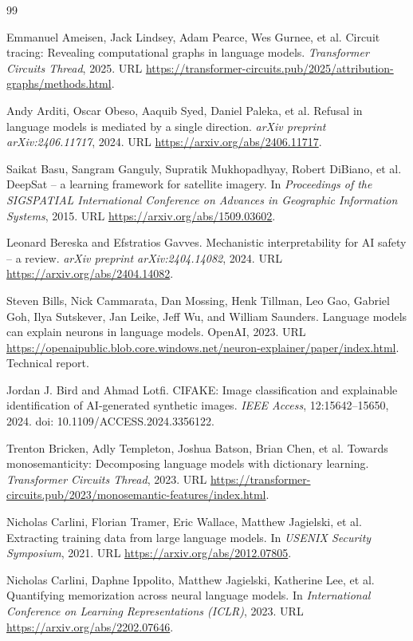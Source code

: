 \documentclass[11pt]{article}
\begin{document}
\begin{thebibliography}{99}

 Emmanuel Ameisen, Jack Lindsey, Adam Pearce, Wes Gurnee, et al. Circuit tracing: Revealing computational graphs in language models. \emph{Transformer Circuits Thread}, 2025. URL \url{https://transformer-circuits.pub/2025/attribution-graphs/methods.html}.

 Andy Arditi, Oscar Obeso, Aaquib Syed, Daniel Paleka, et al. Refusal in language models is mediated by a single direction. \emph{arXiv preprint arXiv:2406.11717}, 2024. URL \url{https://arxiv.org/abs/2406.11717}.

 Saikat Basu, Sangram Ganguly, Supratik Mukhopadhyay, Robert DiBiano, et al. DeepSat -- a learning framework for satellite imagery. In \emph{Proceedings of the SIGSPATIAL International Conference on Advances in Geographic Information Systems}, 2015. URL \url{https://arxiv.org/abs/1509.03602}.

 Leonard Bereska and Efstratios Gavves. Mechanistic interpretability for AI safety -- a review. \emph{arXiv preprint arXiv:2404.14082}, 2024. URL \url{https://arxiv.org/abs/2404.14082}.

 Steven Bills, Nick Cammarata, Dan Mossing, Henk Tillman, Leo Gao, Gabriel Goh, Ilya Sutskever, Jan Leike, Jeff Wu, and William Saunders. Language models can explain neurons in language models. OpenAI, 2023. URL \url{https://openaipublic.blob.core.windows.net/neuron-explainer/paper/index.html}. Technical report.

 Jordan J. Bird and Ahmad Lotfi. CIFAKE: Image classification and explainable identification of AI-generated synthetic images. \emph{IEEE Access}, 12:15642--15650, 2024. doi: 10.1109/ACCESS.2024.3356122.

 Trenton Bricken, Adly Templeton, Joshua Batson, Brian Chen, et al. Towards monosemanticity: Decomposing language models with dictionary learning. \emph{Transformer Circuits Thread}, 2023. URL \url{https://transformer-circuits.pub/2023/monosemantic-features/index.html}.

 Nicholas Carlini, Florian Tramer, Eric Wallace, Matthew Jagielski, et al. Extracting training data from large language models. In \emph{USENIX Security Symposium}, 2021. URL \url{https://arxiv.org/abs/2012.07805}.

 Nicholas Carlini, Daphne Ippolito, Matthew Jagielski, Katherine Lee, et al. Quantifying memorization across neural language models. In \emph{International Conference on Learning Representations (ICLR)}, 2023. URL \url{https://arxiv.org/abs/2202.07646}.


\end{thebibliography}
\end{document}
